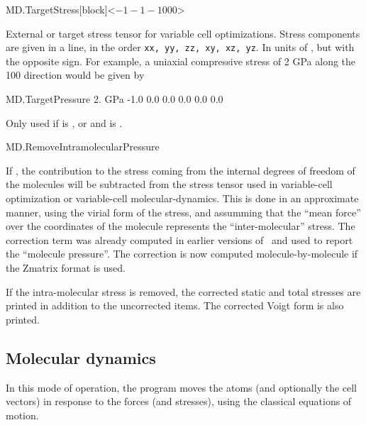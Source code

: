 \begin{fdfentry}{MD.TargetStress}[block]<$-1 -1 -1 0 0 0$>
  
  External or target stress tensor for variable cell optimizations.
  Stress components are given in a line, in the order \texttt{xx, yy,
      zz, xy, xz, yz}. In units of , but
  with the opposite sign. For example, a uniaxial compressive stress
  of 2 GPa along the 100 direction would be given by
  \begin{fdfexample}
     MD.TargetPressure  2. GPa
         -1.0  0.0  0.0  0.0  0.0  0.0
  \end{fdfexample}

  Only used if  is ,  or
   and  is \fdftrue.

\end{fdfentry}


\begin{fdflogicalF}{MD.RemoveIntramolecularPressure}

  If \fdftrue, the contribution to the stress coming from the internal
  degrees of freedom of the molecules will be subtracted from the
  stress tensor used in variable-cell optimization or variable-cell
  molecular-dynamics.  This is done in an approximate manner, using
  the virial form of the stress, and assumming that the ``mean force''
  over the coordinates of the molecule represents the
  ``inter-molecular'' stress. The correction term was already computed
  in earlier versions of \siesta\ and used to report the ``molecule
  pressure''. The correction is now computed molecule-by-molecule if
  the Zmatrix format is used.

  If the intra-molecular stress is removed, the corrected static and
  total stresses are printed in addition to the uncorrected items.
  The corrected Voigt form is also printed.

\end{fdflogicalF}



\subsection{Molecular dynamics}

In this mode of operation, the program moves the atoms (and optionally
the cell vectors) in response to the forces (and stresses), using the
classical equations of motion.

